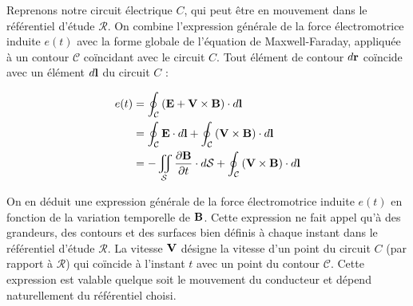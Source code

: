 \documentclass[11pt,a4paper]{report}
\begin{document}
	Reprenons notre circuit électrique $C$, qui peut être en mouvement dans le référentiel d'étude $\mathcal{R}$. On combine l'expression générale de la force électromotrice induite $e(t)$ avec la forme globale de l'équation de Maxwell-Faraday, appliquée à un contour $\mathcal{C}$ coïncidant avec le circuit $C$. Tout élément de contour $d\bold{r}$ coïncide avec un élément $d\bold{l}$ du circuit $C$ :
	
	\begin{align}
   		e(t)& =  \oint_\mathcal{C}\left(\bold{E} + \bold{V}\times\bold{B}\right)\cdot d\bold{l}   \\
   		    & =  \oint_\mathcal{C}\bold{E}\cdot d\bold{l} + \oint_\mathcal{C}\left(\bold{V}\times\bold{B}\right)\cdot d\bold{l} \\
   	 		& =  - \iint_\mathcal{S}\frac{\partial\bold{B}}{\partial t}\cdot d\mathcal{S} + \oint_\mathcal{C}\left(\bold{V}\times\bold{B}\right)\cdot d\bold{l}
	\end{align}
		
	On en déduit une expression générale de la force électromotrice induite $e(t)$ en fonction de la variation temporelle de $\bold{B}$. Cette expression ne fait appel qu'à des grandeurs, des contours et des surfaces bien définis à chaque instant dans le référentiel d'étude $\mathcal{R}$. La vitesse $\bold{V}$ désigne la vitesse d'un point du circuit $C$ (par rapport à $\mathcal{R}$) qui coïncide à l'instant $t$ avec un point du contour $\mathcal{C}$. Cette expression est valable quelque soit le mouvement du conducteur et dépend naturellement du référentiel choisi.\\
	
\end{document}
